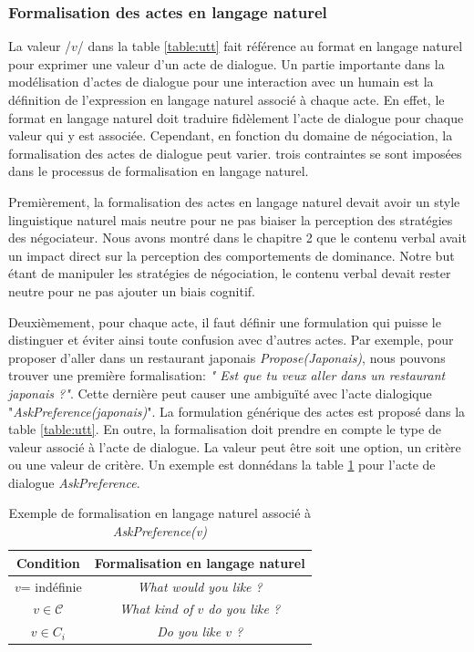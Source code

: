 				
		\subsubsection{Formalisation des actes en langage naturel}
		\label{sec:formalisation}
			La valeur /$v$/ dans la table \ref{table:utt} fait référence au format en langage naturel pour exprimer une valeur d'un acte de dialogue.
			Un partie importante dans la modélisation d'actes de dialogue pour une interaction avec un humain est la définition de l'expression en langage naturel associé à chaque acte. En effet, le format en langage naturel doit traduire fidèlement l'acte de dialogue pour chaque valeur qui y est associée.
			Cependant, en fonction du domaine de négociation, la formalisation des actes de dialogue peut varier. trois contraintes se sont imposées dans le processus de formalisation en langage naturel. 
			
			Premièrement, la formalisation des actes en langage naturel devait avoir un style linguistique naturel mais neutre pour ne pas biaiser la perception des stratégies des négociateur. Nous avons montré dans le chapitre 2 que le contenu verbal avait un impact direct sur la perception des comportements de dominance. 
			Notre but étant de manipuler les stratégies de négociation, le contenu verbal devait rester neutre pour ne pas ajouter un biais cognitif.
			
			Deuxièmement, pour chaque acte, il faut définir une formulation qui puisse le distinguer et éviter ainsi toute confusion avec d'autres actes. Par exemple, pour proposer d'aller dans un restaurant japonais \emph{Propose(Japonais)}, nous pouvons trouver une première formalisation: \emph{" Est que tu veux aller dans un restaurant japonais ?"}. Cette dernière peut causer une ambiguïté avec l'acte dialogique "\textit{AskPreference(japonais)}". 
			La formulation générique des actes est proposé dans la table \ref{table:utt}. En outre, la formalisation doit prendre en compte le type de valeur associé à l'acte de dialogue. La valeur peut être soit une option, un critère ou une valeur de critère. Un exemple est donnédans la table \ref{tab:askEx} pour l'acte de dialogue \emph{AskPreference}. 
			
			
				\begin{table} [h]
					\begin{tabular} {c c}
						\hline
						\hline
						\textbf{Condition} &\textbf{ Formalisation en langage naturel }\\
						\hline
						$v$= indéfinie & \textit{What would you like ?} \\
						\hline
						$v \in \mathcal{C}$ & \textit{What kind of $v$ do you like ?} \\
						\hline
						$ v \in C_i $ & \textit{Do you like $v$ ?} \\
						\hline
						\hline
						
					\end{tabular}
					\caption{\label{tab:askEx} Exemple de formalisation en langage naturel associé à \emph{AskPreference(v)}}
				\end{table}
			
